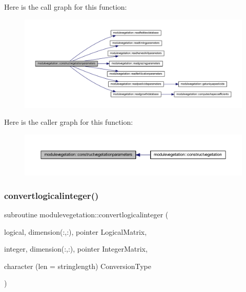 Here is the call graph for this function\+:\nopagebreak
\begin{figure}[H]
\begin{center}
\leavevmode
\includegraphics[width=350pt]{namespacemodulevegetation_a11da2d592ded0bd3811f9e90de324046_cgraph}
\end{center}
\end{figure}
Here is the caller graph for this function\+:\nopagebreak
\begin{figure}[H]
\begin{center}
\leavevmode
\includegraphics[width=350pt]{namespacemodulevegetation_a11da2d592ded0bd3811f9e90de324046_icgraph}
\end{center}
\end{figure}
\mbox{\label{namespacemodulevegetation_af795c019d50bbacd6767423599de5ea5}} 
\subsubsection{\texorpdfstring{convertlogicalinteger()}{convertlogicalinteger()}}
{\footnotesize\ttfamily subroutine modulevegetation\+::convertlogicalinteger (\begin{DoxyParamCaption}\item[{logical, dimension(\+:,\+:), pointer}]{Logical\+Matrix,  }\item[{integer, dimension(\+:,\+:), pointer}]{Integer\+Matrix,  }\item[{character (len = stringlength)}]{Conversion\+Type }\end{DoxyParamCaption})\hspace{0.3cm}{\ttfamily [private]}}

